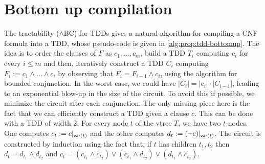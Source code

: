 \documentclass[a4paper,UKenglish,cleveref, autoref, thm-restate]{lipics-v2021}
\newcommand{\guy}[1]{\todo[color=purple]{\color{white}{{\bf Guy}: #1}}}
\begin{document}
\section{Bottom up compilation}
\label{sec:prop:struct-cnf}

The tractability ($\wedge$BC) for TDDs gives a natural algorithm for compiling a CNF formula into a
TDD, whose pseudo-code is given in \cref{alg:prop:tdd-bottomup}. The idea is to order the clauses of $F$ as $c_1,\dots,c_m$, build a TDD $T_i$ computing $c_i$ for every $i \leq m$ and then, iteratively construct a TDD $C_i$ computing $F_i := c_1 \wedge \dots \wedge c_i$ by observing that $F_i = F_{i-1} \wedge c_i$, using the algorithm for bounded conjunction. In the worst case, we could have $|C_i| = |c_i| \cdot |C_{i-1}|$, leading to an exponential blow-up in the size of the circuit. To avoid this if possible, we minimize the circuit after each conjunction. The only missing piece here is the fact that we can efficiently construct a TDD given a clause $c$. This can be done with a TDD of width $2$. For every node $t$ of the vtree $T$, we have two $t$-nodes. One computes $c_t := c|_{\mathsf{var}(t)}$ and the other computes $d_t := (\neg c)|_{\mathsf{var}(t)}$. The circuit is constructed by induction using the fact that, if $t$ has children $t_1,t_2$ then $d_t = d_{t_1} \wedge d_{t_2}$ and $c_t = (c_{t_1} \wedge c_{t_2}) \vee (c_{t_1} \wedge d_{t_2}) \vee (d_{t_1} \wedge c_{t_2})$. %

\end{document}
